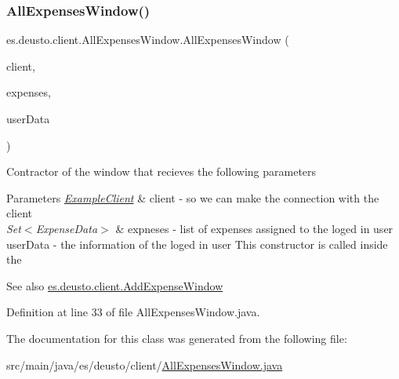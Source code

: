 \subsubsection{\texorpdfstring{All\+Expenses\+Window()}{AllExpensesWindow()}}
{\footnotesize\ttfamily es.\+deusto.\+client.\+All\+Expenses\+Window.\+All\+Expenses\+Window (\begin{DoxyParamCaption}\item[{\hyperlink{classes_1_1deusto_1_1client_1_1_example_client}{Example\+Client}}]{client,  }\item[{Set$<$ \hyperlink{classes_1_1deusto_1_1serialization_1_1_expense_data}{Expense\+Data} $>$}]{expenses,  }\item[{\hyperlink{classes_1_1deusto_1_1serialization_1_1_user_data}{User\+Data}}]{user\+Data }\end{DoxyParamCaption})}

Contractor of the window that recieves the following parameters 
\begin{DoxyParams}{Parameters}
{\em \hyperlink{classes_1_1deusto_1_1client_1_1_example_client}{Example\+Client}} & client -\/ so we can make the connection with the client \\
\hline
{\em Set$<$\+Expense\+Data$>$} & expneses -\/ list of expenses assigned to the loged in user  user\+Data -\/ the information of the loged in user This constructor is called inside the \\
\hline
\end{DoxyParams}
\begin{DoxySeeAlso}{See also}
\hyperlink{classes_1_1deusto_1_1client_1_1_add_expense_window}{es.\+deusto.\+client.\+Add\+Expense\+Window} 
\end{DoxySeeAlso}


Definition at line 33 of file All\+Expenses\+Window.\+java.



The documentation for this class was generated from the following file\+:\begin{DoxyCompactItemize}
\item 
src/main/java/es/deusto/client/\hyperlink{_all_expenses_window_8java}{All\+Expenses\+Window.\+java}\end{DoxyCompactItemize}
